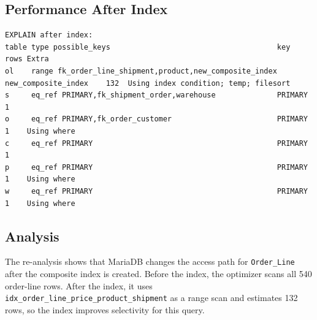 \subsection{Performance After Index}
{\scriptsize
\begin{verbatim}
EXPLAIN after index:
table type possible_keys                                      key                    rows Extra
ol    range fk_order_line_shipment,product,new_composite_index new_composite_index    132  Using index condition; temp; filesort
s     eq_ref PRIMARY,fk_shipment_order,warehouse              PRIMARY                1
o     eq_ref PRIMARY,fk_order_customer                        PRIMARY                1    Using where
c     eq_ref PRIMARY                                          PRIMARY                1
p     eq_ref PRIMARY                                          PRIMARY                1    Using where
w     eq_ref PRIMARY                                          PRIMARY                1    Using where
\end{verbatim}
}

\subsection{Analysis}
The re-analysis shows that MariaDB changes the access path for \texttt{Order\_Line} after the composite index is created. Before the index, the optimizer scans all 540 order-line rows. After the index, it uses \texttt{idx\_order\_line\_price\_product\_shipment} as a range scan and estimates 132 rows, so the index improves selectivity for this query.
